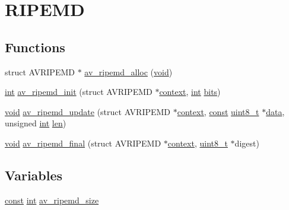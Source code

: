 \hypertarget{group__lavu__ripemd}{}\section{R\+I\+P\+E\+MD}
\label{group__lavu__ripemd}
\subsection*{Functions}
\begin{DoxyCompactItemize}
\item 
struct A\+V\+R\+I\+P\+E\+MD $\ast$ \hyperlink{group__lavu__ripemd_gac5bd1677ed92c9330ed348e5657b39e1}{av\+\_\+ripemd\+\_\+alloc} (\hyperlink{sound_8c_ae35f5844602719cf66324f4de2a658b3}{void})
\item 
\hyperlink{xmltok_8h_a5a0d4a5641ce434f1d23533f2b2e6653}{int} \hyperlink{group__lavu__ripemd_ga4629925d978ee6975daecfad6921b799}{av\+\_\+ripemd\+\_\+init} (struct A\+V\+R\+I\+P\+E\+MD $\ast$\hyperlink{structcontext}{context}, \hyperlink{xmltok_8h_a5a0d4a5641ce434f1d23533f2b2e6653}{int} \hyperlink{metrics_8c_a1eb8fc809d37cc6176f7f27374b063d0}{bits})
\item 
\hyperlink{sound_8c_ae35f5844602719cf66324f4de2a658b3}{void} \hyperlink{group__lavu__ripemd_ga7a87a9fe45d426f9ecfcfeb2eedf93ec}{av\+\_\+ripemd\+\_\+update} (struct A\+V\+R\+I\+P\+E\+MD $\ast$\hyperlink{structcontext}{context}, \hyperlink{getopt1_8c_a2c212835823e3c54a8ab6d95c652660e}{const} \hyperlink{lib-src_2ffmpeg_2win32_2stdint_8h_a9a941819355e6f658991890ff66b4b0e}{uint8\+\_\+t} $\ast$\hyperlink{lib_2expat_8h_ac39e72a1de1cb50dbdc54b08d0432a24}{data}, unsigned \hyperlink{xmltok_8h_a5a0d4a5641ce434f1d23533f2b2e6653}{int} \hyperlink{lib_2expat_8h_af86d325fecfc8f47b61fbf5a5146f582}{len})
\item 
\hyperlink{sound_8c_ae35f5844602719cf66324f4de2a658b3}{void} \hyperlink{group__lavu__ripemd_ga10a142f6a13c54e0b12e29eb6bcd75be}{av\+\_\+ripemd\+\_\+final} (struct A\+V\+R\+I\+P\+E\+MD $\ast$\hyperlink{structcontext}{context}, \hyperlink{lib-src_2ffmpeg_2win32_2stdint_8h_a9a941819355e6f658991890ff66b4b0e}{uint8\+\_\+t} $\ast$digest)
\end{DoxyCompactItemize}
\subsection*{Variables}
\begin{DoxyCompactItemize}
\item 
\hyperlink{getopt1_8c_a2c212835823e3c54a8ab6d95c652660e}{const} \hyperlink{xmltok_8h_a5a0d4a5641ce434f1d23533f2b2e6653}{int} \hyperlink{group__lavu__ripemd_gad5e60759f7ece82caf50ea4e8623649c}{av\+\_\+ripemd\+\_\+size}
\end{DoxyCompactItemize}


